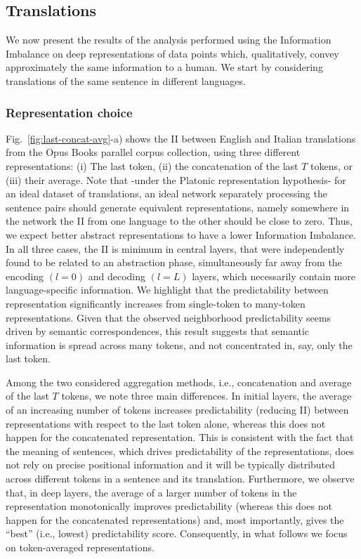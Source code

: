 \documentclass[10pt]{article} %
\begin{document}
\subsection{Translations}

We now present the results of the analysis performed using the Information Imbalance on deep representations of data points which, qualitatively, convey approximately the same information to a human. We start by considering  translations of the same sentence in different languages. 

\subsubsection{Representation choice}
\label{sec:last-concat-avg}

Fig.~\ref{fig:last-concat-avg}-a) shows the II between English and Italian translations from the Opus Books parallel corpus collection, using three different representations: (i) The last token, (ii) the concatenation of the last $T$ tokens, or (iii) their average. 
Note that -under the Platonic representation hypothesis- for an ideal dataset of translations, an ideal network separately processing the sentence pairs should generate equivalent representations, namely somewhere in the network the II from one language to the other should be close to zero. Thus, we expect better abstract representations to have a lower Information Imbalance.
In all three cases, the II is minimum in central layers, that were independently found to be related to an abstraction phase\citep{cheng2025emergence}, simultaneously far away from the encoding $(l=0)$ and decoding $(l=L)$ layers, which necessarily contain more language-specific information.
%
We highlight that the predictability between representation significantly increases from single-token to many-token representations. Given that the observed neighborhood predictability seems driven by semantic correspondences, this result suggests that semantic information is spread across many tokens, and not concentrated in, say, only the last token.
%

Among the two considered aggregation methods, i.e., concatenation and average of the last $T$ tokens, we note three main differences. 
In initial layers, the average of an increasing number of tokens increases predictability (reducing II) between representations with respect to the last token alone, whereas this does not happen for the concatenated representation. 
This is consistent with the fact that the meaning of sentences, which drives predictability of the representations, does not rely on precise positional information and it will be typically distributed across different tokens in a sentence and its translation. 
Furthermore, we observe that, in deep layers, the average of a larger number of tokens in the representation monotonically improves predictability (whereas this does not happen for the concatenated representations) and, most importantly, gives the ``best'' (i.e., lowest) predictability score. 
Consequently, in what follows we focus on token-averaged representations.
\end{document}
